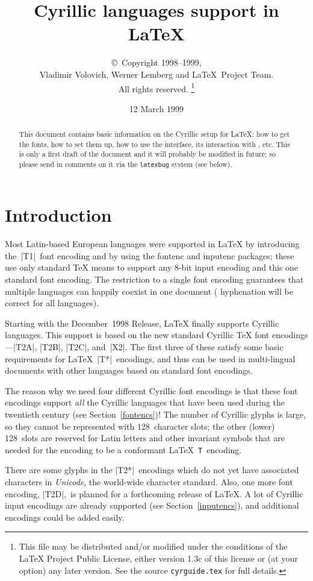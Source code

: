 \documentclass{ltxguide}[1999/02/28]
\title{Cyrillic languages support in \LaTeX}
\author{\copyright~Copyright 1998--1999,\\ Vladimir Volovich,
        Werner Lemberg and \LaTeX\ Project Team.\\ All rights reserved.%
        \footnote{This file may be distributed and/or modified under the
          conditions of the \LaTeX{} Project Public License, either version 1.3c
          of this license or (at your option) any later version. See the source
         \texttt{cyrguide.tex} for full details.}%
}
\date{12 March 1999}
\begin{document}
\maketitle
\tableofcontents

\begin{abstract}
  This document contains basic information on the Cyrillic setup for
  \LaTeX{}: how to get the fonts, how to set them up, how to use
  the interface, its interaction with \babel{}, etc. This is only a first
  draft of the document and it will probably be modified in future; so
  please send in comments on it via the \texttt{latexbug} system
  (see below).
\end{abstract}


\section{Introduction}

Most Latin-based European languages were supported in \LaTeX{} by
introducing the~|T1|~font encoding and by using the \textsf{fontenc}
and \textsf{inputenc} packages; these use only standard \TeX{} means
to support any \mbox{8-bit} input encoding and this one standard font
encoding.  The restriction to a single font encoding guarantees that
multiple languages can happily coexist in one document (\eg
hyphenation will be correct for all languages).

Starting  with the December~1998 Release, \LaTeX{} finally supports
Cyrillic languages.  This support is based on the new standard
Cyrillic \TeX{} font encodings---|T2A|, |T2B|, |T2C|, and~|X2|.  The
first three of these satisfy some basic requirements for
\LaTeX{}~|T*|~encodings, and thus can be used in multi-lingual documents
with other languages based on standard font encodings.

The reason why we need four different Cyrillic font encodings is that
these font encodings support \emph{all} the Cyrillic languages that
have been used during the twentieth century (see
Section~\ref{fontencs})!  The number of Cyrillic glyphs is large, so
they cannot be represented with 128~character slots; the other (lower)
128~slots are reserved for Latin letters and other invariant symbols
that are needed for the encoding to be a conformant
\LaTeX{}~\texttt{T}~encoding.

There are some glyphs in the |T2*|~encodings which do not yet have
associated characters in \emph{Unicode}, the world-wide character
standard.  Also, one more font encoding, |T2D|,~is planned for a
forthcoming release of \LaTeX{}.  A lot of Cyrillic input encodings
are already supported (see Section~\ref{inputencs}), and additional
encodings could be added easily.
\end{document}
